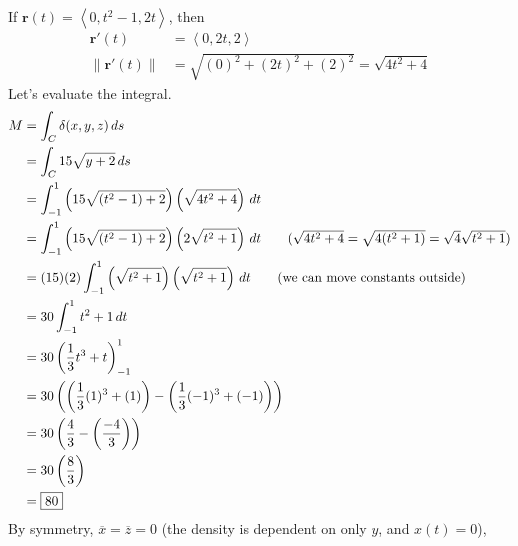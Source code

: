 \documentclass{article}
\newcommand{\lrp}[1]{\left( #1 \right)}
\newcommand{\lra}[1]{\left\langle #1 \right\rangle}
\newcommand{\norm}[1]{\left\lVert #1 \right\rVert}
\renewcommand{\r}[0]{\mathbf{r}}
\begin{document}
If $\r(t)=\lra{0,t^2-1,2t}$, then
\begin{align*}
    \r'(t)&=\lra{0,2t,2}\\
    \norm{\r'(t)}&=\sqrt{(0)^2 + (2t)^2 + (2)^2}=\sqrt{4t^2+4}
\end{align*}
Let's evaluate the integral.
\begin{align*}
    M&=\int_C \delta(x,y,z)\,ds\\
    &=\int_C 15\sqrt{y+2}\,ds\\
    &=\int_{-1}^1 \lrp{15\sqrt{(t^2-1)+2}}\lrp{\sqrt{4t^2+4}}\,dt\\
    &=\int_{-1}^1\lrp{15\sqrt{(t^2-1)+2}}\lrp{2\sqrt{t^2+1}}\,dt\tag{$\sqrt{4t^2+4}=\sqrt{4(t^2+1)}=\sqrt{4}\sqrt{t^2+1}$}\\
    &=(15)(2)\int_{-1}^1 \lrp{\sqrt{t^2 +1}}\lrp{\sqrt{t^2+1}}\,dt\tag{we can move constants outside}\\
    &=30\int_{-1}^1 t^2 + 1\,dt\\
    &=30\lrp{\frac{1}{3}t^3 + t}_{-1}^1\\
    &=30\lrp{\lrp{\frac{1}{3}(1)^3+(1)}-\lrp{\frac{1}{3}(-1)^3+(-1)}}\\
    &=30\lrp{\frac{4}{3}-\lrp{\frac{-4}{3}}}\\
    &=30\lrp{\frac{8}{3}}\\
    &=\boxed{80}
\end{align*}
By symmetry, $\overline{x}=\overline{z}=0$ (the density is dependent on only $y$, and $x(t)=0$),
\end{document}
